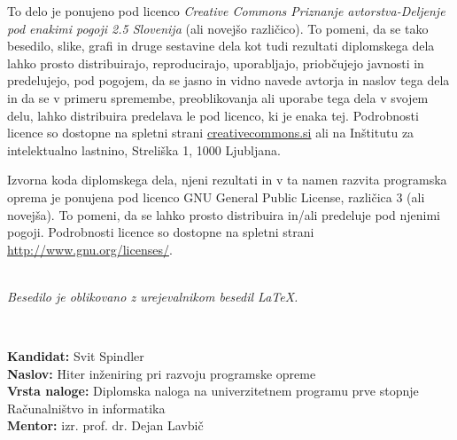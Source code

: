 \documentclass[a4paper,12pt,openright]{book}
\newcommand{\clearemptydoublepage}{\newpage{\pagestyle{empty}\cleardoublepage}}
\begin{document}
\newpage
\thispagestyle{empty}

\vspace*{5cm}
{\small \noindent
To delo je ponujeno pod licenco \textit{Creative Commons Priznanje avtorstva-Deljenje pod enakimi pogoji 2.5 Slovenija} (ali novej\v so razli\v cico).
To pomeni, da se tako besedilo, slike, grafi in druge sestavine dela kot tudi rezultati diplomskega dela lahko prosto distribuirajo,
reproducirajo, uporabljajo, priobčujejo javnosti in predelujejo, pod pogojem, da se jasno in vidno navede avtorja in naslov tega
dela in da se v primeru spremembe, preoblikovanja ali uporabe tega dela v svojem delu, lahko distribuira predelava le pod
licenco, ki je enaka tej.
Podrobnosti licence so dostopne na spletni strani \href{http://creativecommons.si}{creativecommons.si} ali na Inštitutu za
intelektualno lastnino, Streliška 1, 1000 Ljubljana.

\vspace*{1cm}
}

\vspace*{1cm}
{\small \noindent
Izvorna koda diplomskega dela, njeni rezultati in v ta namen razvita programska oprema je ponujena pod licenco GNU General Public License,
različica 3 (ali novejša). To pomeni, da se lahko prosto distribuira in/ali predeluje pod njenimi pogoji.
Podrobnosti licence so dostopne na spletni strani \url{http://www.gnu.org/licenses/}.
}

\vfill
\begin{center} 
\ \\ \vfill
{\em
Besedilo je oblikovano z urejevalnikom besedil \LaTeX.}
\end{center}

\clearemptydoublepage

\thispagestyle{empty}
\
\vfill

\bigskip
\noindent\textbf{Kandidat:} Svit Spindler\\
\noindent\textbf{Naslov:} Hiter inženiring pri razvoju
programske opreme\\
\noindent\textbf{Vrsta naloge:} Diplomska naloga na univerzitetnem programu prve stopnje Računalništvo in informatika \\
\noindent\textbf{Mentor:} izr. prof. dr. Dejan Lavbič\\
\end{document}

